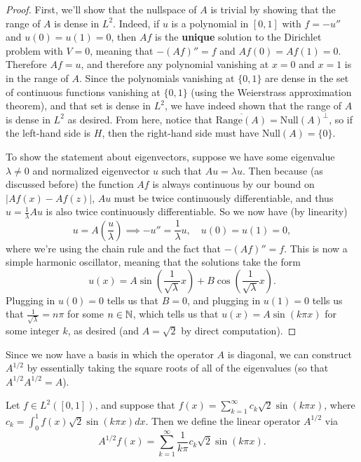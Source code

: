 \begin{proof}
First, we'll show that the nullspace of $A$ is trivial by showing that the range of $A$ is dense in $L^2$. Indeed, if $u$ is a polynomial in $[0, 1]$ with $f = -u''$ and $u(0) = u(1) = 0$, then $Af$ is the \textbf{unique} solution to the Dirichlet problem with $V = 0$, meaning that $-(Af)'' = f$ and $Af(0) = Af(1) = 0$. Therefore $Af = u$, and therefore any polynomial vanishing at $x = 0$ and $x = 1$ is in the range of $A$. Since the polynomials vanishing at $\{0, 1\}$ are dense in the set of continuous functions vanishing at $\{0, 1\}$ (using the Weierstrass approximation theorem), and that set is dense in $L^2$, we have indeed shown that the range of $A$ is dense in $L^2$ as desired. From here, notice that $\overline{\text{Range}(A)} = \text{Null}(A)^\perp$, so if the left-hand side is $H$, then the right-hand side must have $\text{Null}(A) = \{0\}$.

To show the statement about eigenvectors, suppose we have some eigenvalue $\lambda \ne 0$ and normalized eigenvector $u$ such that $Au = \lambda u$. Then because (as discussed before) the function $Af$ is always continuous by our bound on $|Af(x) - Af(z)|$, $Au$ must be twice continuously differentiable, and thus $u = \frac{1}{\lambda} Au$ is also twice continuously differentiable. So we now have (by linearity)
\[
    u = A\left(\frac{u}{\lambda}\right) \implies -u'' = \frac{1}{\lambda} u, \quad u(0) = u(1) = 0,
\]
where we're using the chain rule and the fact that $-(Af)'' = f$. This is now a simple harmonic oscillator, meaning that the solutions take the form 
\[
    u(x) = A \sin \left(\frac{1}{\sqrt{\lambda}} x\right) + B \cos\left(\frac{1}{\sqrt{\lambda}} x\right).
\]
Plugging in $u(0) = 0$ tells us that $B = 0$, and plugging in $u(1) = 0$ tells us that $\frac{1}{\sqrt{\lambda}} = n\pi$ for some $n \in \mathbb N$, which tells us that $u(x) = A \sin(k \pi x)$ for some integer $k$, as desired (and $A = \sqrt{2}$ by direct computation). 
\end{proof}

Since we now have a basis in which the operator $A$ is diagonal, we can construct $A^{1/2}$ by essentially taking the square roots of all of the eigenvalues (so that $A^{1/2}A^{1/2} = A$). 

\begin{definition}
Let $f \in L^2([0, 1])$, and suppose that $f(x) = \sum_{k=1}^{\infty} c_k \sqrt{2} \sin(k \pi x)$, where $c_k = \int_0^1 f(x) \sqrt{2} \sin (k \pi x) dx$. Then we define the linear operator $A^{1/2}$ via
\[
    A^{1/2}f(x) = \sum_{k=1}^{\infty} \frac{1}{k\pi} c_k \sqrt{2} \sin (k\pi x).
\]
\end{definition}

